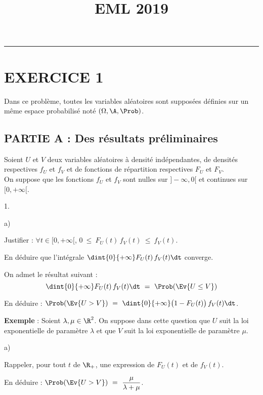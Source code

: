 \documentclass[11pt]{article}%
\title{\bf \vspace{-1.6cm} EML 2019} %
\author{} %
\date{} %
\begin{document}
\maketitle %
\vspace{-1.2cm}\hrule %
\thispagestyle{fancy}

\vspace*{-.2cm}


\section*{EXERCICE 1}

\noindent %
Dans ce problème, toutes les variables aléatoires sont supposées
définies sur un même espace probabilisé noté $(\Omega, \A, \Prob)$. %

\subsection*{PARTIE A : Des résultats préliminaires} %

\noindent %
Soient $U$ et $V$ deux variables aléatoires à densité indépendantes,
de densités respectives $f_U$ et $f_V$ et de fonctions de répartition
respectives $F_U$ et $F_V$.\\
On suppose que les fonctions $f_U$ et $f_V$ sont nulles sur $]-\infty,
0[$ et continues sur $[0,+\infty[$.
\begin{noliste}{1.}
  \setlength{\itemsep}{4mm}
\item
  \begin{noliste}{a)}
    \setlength{\itemsep}{2mm}
  \item Justifier : $\forall t \in [0,+\infty[$, $0 \ \leq \ F_U(t) \,
    f_V(t) \ \leq \ f_V(t)$.
    
  \item En déduire que l'intégrale $\dint{0}{+\infty} F_U(t) \, f_V(t)
    \dt$ converge.
  \end{noliste}
  On admet le résultat suivant :
  \[
    \dint{0}{+\infty} F_U(t) \, f_V(t) \dt \ = \ \Prob(\Ev{U \leq V})
  \]
  
\item En déduire : $\Prob(\Ev{U > V}) \ = \ \dint{0}{+\infty} \big(1 -
  F_U(t)\big) \, f_V(t) \dt$.
  
\item {\bf Exemple} : Soient $\lambda, \mu \in \R^2$. On suppose dans
  cette question que $U$ suit la loi exponentielle de paramètre
  $\lambda$ et que $V$ suit la loi exponentielle de paramètre $\mu$.
  \begin{noliste}{a)}
    \setlength{\itemsep}{2mm}
  \item Rappeler, pour tout $t$ de $\R_+$, une expression de $F_U(t)$
    et de $f_V(t)$.
    
  \item En déduire : $\Prob(\Ev{U > V}) \ = \ \dfrac{\mu}{\lambda + \mu}$.
  \end{noliste}
\end{noliste}
\end{document}
